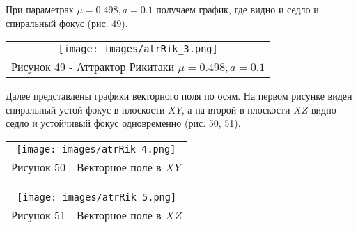 При параметрах $\mu=0.498,a=0.1$ получаем график, где видно и седло и спиральный фокус (рис. 49).

\begin{center}
  \begin{tabular}{c}
  \texttt{[image: images/atrRik\_3.png]}\\
  Рисунок 49 - Аттрактор Рикитаки $\mu=0.498,a=0.1$
\end{tabular}
\end{center}

Далее представлены графики векторного поля по осям. На первом рисунке виден спиральный устой фокус в плоскости $XY$, а на второй в плоскости $XZ$ видно седло и устойчивый фокус одновременно (рис. 50, 51).

\begin{center}
  \begin{tabular}{c}
  \texttt{[image: images/atrRik\_4.png]}\\
  Рисунок 50 - Векторное поле в $XY$
  \end{tabular}
  \end{center}
  \begin{center}
    \begin{tabular}{c}
  \texttt{[image: images/atrRik\_5.png]}\\
  Рисунок 51 - Векторное поле в $XZ$
\end{tabular}
\end{center}

% 
